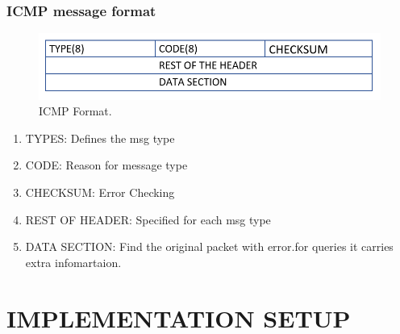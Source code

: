 \documentclass[12pt,a4paper]{article}
\begin{document}
\subsubsection {ICMP message format}
\begin{figure}[h]
 		\centering
				\includegraphics[scale=0.75]{1.5.png}	
			\caption{ICMP Format.}
			\label{fig:AP}
	\end{figure}
 \begin{enumerate}
\item TYPES: Defines the msg type
\item CODE: Reason for  message type 
\item CHECKSUM: Error Checking
\item REST OF HEADER: Specified for each msg type
\item DATA SECTION: Find the original packet with error.for queries it carries extra infomartaion.
\end{enumerate}
\pagebreak

\section{\Large{IMPLEMENTATION SETUP}}
\end{document}
